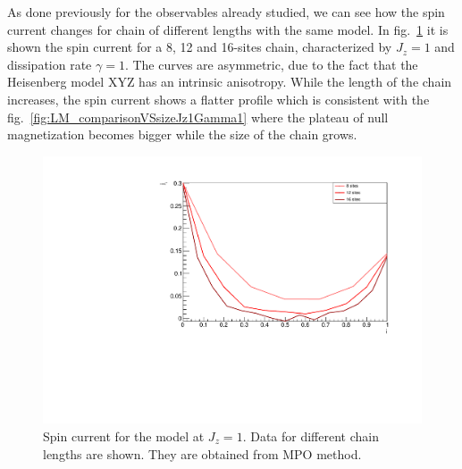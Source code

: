 %
%
%

As done previously for the observables already studied, we can see how the spin current changes for chain of different lengths with the same model. In fig.~\ref{fig:NORM_SpinCurr_comparisonVSsize} it is shown the spin current for a 8, 12 and 16-sites chain, characterized by $J_z = 1$ and dissipation rate $\gamma = 1$. The curves are asymmetric, due to the fact that the Heisenberg model XYZ has an intrinsic anisotropy. While the length of the chain increases, the spin current shows a flatter profile which is consistent with the fig.~\ref{fig:LM_comparisonVSsizeJz1Gamma1} where the plateau of null magnetization becomes bigger while the size of the chain grows.

\begin{figure}[H]
    \centering
    \includegraphics[scale=0.7]{Figures/NORM_SpinCurr_comparisonVSsize.pdf}
    \captionsetup{width=1.\linewidth}
    \caption{Spin current for the model at $J_z = 1$. Data for different chain lengths are shown. They are obtained from MPO method.}
    \label{fig:NORM_SpinCurr_comparisonVSsize}
\end{figure}

